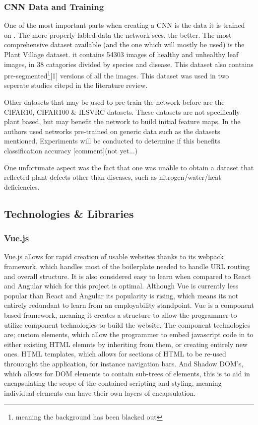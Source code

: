     \subsubsection{CNN Data and Training}
      One of the most important parts when creating a CNN is the data it is trained on \citep{Halevy2009}. The more properly labled data the network sees, the better. The most comprehensive dataset available (and the one which will mostly be used) is the Plant Village dataset. it contains 54303 images of healthy and unhealthy leaf images, in 38 catagories divided by species and disease. This dataset also contains pre-segmented\footnote{meaning the background has been blacked out}[1] versions of all the images. This dataset was used in two seperate studies citepd in the literature review.
      \par
      Other datasets that may be used to pre-train the network before are the CIFAR10, CIFAR100 \& ILSVRC datasets. These datasets are not specifically plant based, but may benefit the network to build initial feature maps. In \citep{Choi} the authors used networks pre-trained on generic data such as the datasets mentioned. Experiments will be conducted to determine if this benefits classification accuracy [comment](not yet...)
      \par
      One unfortunate aspect was the fact that one was unable to obtain a dataset that reflected plant defects other than diseases, such as nitrogen/water/heat deficiencies.


\subsection{Technologies \& Libraries}
  \subsubsection{Vue.js}
    Vue.js allows for rapid creation of usable websites thanks to its webpack framework, which handles most of the boilerplate needed to handle URL routing and overall structure. It is also considered easy to learn when compared to React and Angular \citep{StudiengangBachelor} which for this project is optimal. Although Vue is currently less popular than React and Angular its popularity is rising, which means its not entirely redundant to learn from an employability standpoint. Vue is a component based framework, meaning it creates a structure to allow the programmer to utilize component technologies to build the website. The component technologies are; custom elements, which allow the programmer to embed javascript code in to either existing HTML elemnts by inheriting from them, or creating entirely new ones. HTML templates, which allows for sections of HTML to be re-used throuought the application, for instance navigation bars. And Shadow DOM's, which allows for DOM elements to contain sub-trees of elements, this is to aid in encapsulating the scope of the contained scripting and styling, meaning individual elements can have their own layers of encapsulation.
